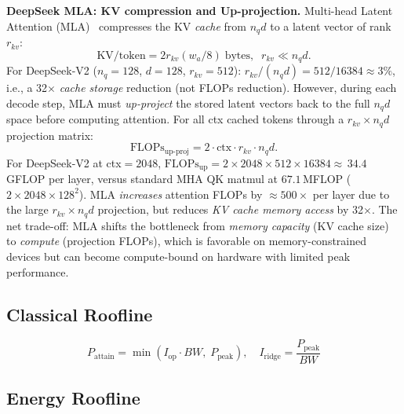 \documentclass[journal]{IEEEtran}
\begin{document}
\noindent\textbf{DeepSeek MLA: KV compression and Up-projection.}
Multi-head Latent Attention (MLA)~\cite{deepseekv2} compresses the KV
\emph{cache} from $n_q d$ to a latent vector of rank $r_{kv}$:
\begin{equation}
  \text{KV/token} = 2 r_{kv} (w_a/8)\;\text{bytes},\;\;
  r_{kv} \ll n_q d.
  \label{eq:mla_cache}
\end{equation}
For DeepSeek-V2 ($n_q{=}128$, $d{=}128$, $r_{kv}{=}512$):
$r_{kv}/(n_q d) = 512/16384 \approx 3\%$,
i.e., a 32$\times$ \emph{cache storage} reduction (not FLOPs reduction).
However, during each decode step, MLA must \emph{up-project} the stored
latent vectors back to the full $n_q d$ space before computing attention.
For all ctx cached tokens through a $r_{kv}{\times}n_q d$ projection matrix:
\begin{equation}
  \text{FLOPs}_\text{up-proj} = 2\!\cdot\!\text{ctx}\!\cdot\!r_{kv}\!\cdot\!n_q d.
  \label{eq:mla_upproj}
\end{equation}
For DeepSeek-V2 at ctx${=}2048$,
$\text{FLOPs}_\text{up} {=} 2{\times}2048{\times}512{\times}16384
{\approx}\,34.4$\,GFLOP per layer, versus standard MHA QK matmul
at $67.1$\,MFLOP ($2{\times}2048{\times}128^2$).
MLA \emph{increases} attention FLOPs by ${\approx}500\times$ per layer due
to the large $r_{kv}{\times}n_q d$ projection, but reduces \emph{KV cache
memory access} by 32$\times$.
The net trade-off: MLA shifts the bottleneck from
\emph{memory capacity} (KV cache size) to \emph{compute} (projection FLOPs),
which is favorable on memory-constrained devices but can become
compute-bound on hardware with limited peak performance.

\subsection{Classical Roofline}

\begin{equation}
  P_\text{attain} = \min\!\left(I_\text{op}\cdot BW,\;P_\text{peak}\right),\quad
  I_\text{ridge} = \frac{P_\text{peak}}{BW}
  \label{eq:roofline}
\end{equation}

\subsection{Energy Roofline}
\end{document}
